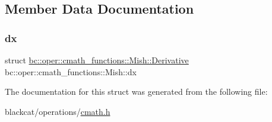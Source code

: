 \subsection{Member Data Documentation}
\mbox{\label{structbc_1_1oper_1_1cmath__functions_1_1Mish_a4351fe9f41d7a7d5416435284617e3a6}} 
\subsubsection{\texorpdfstring{dx}{dx}}
{\footnotesize\ttfamily struct \hyperlink{structbc_1_1oper_1_1cmath__functions_1_1Mish_1_1Derivative}{bc\+::oper\+::cmath\+\_\+functions\+::\+Mish\+::\+Derivative}   bc\+::oper\+::cmath\+\_\+functions\+::\+Mish\+::dx}



The documentation for this struct was generated from the following file\+:\begin{DoxyCompactItemize}
\item 
blackcat/operations/\hyperlink{cmath_8h}{cmath.\+h}\end{DoxyCompactItemize}
